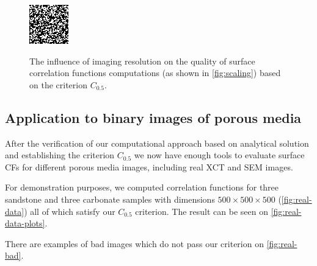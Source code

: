 \documentclass[reprint,amsmath,amssymb,aps,pre,showkeys,showpacs]{revtex4-1}
\begin{document}
\begin{figure}[t]
{    \includegraphics[width=0.475\linewidth]{images/disks-0015-5e-5-64.png}
    \label{fig:disks-64}}
  \caption[]{The influence of imaging resolution on the quality of surface
    correlation functions computations (as shown in \cref{fig:scaling}) based on
    the criterion $C_{0.5}$.}
  \label{fig:disks-res}
\end{figure}

\subsection{Application to binary images of porous media}
\label{sec:application}
After the verification of our computational approach based on analytical
solution and establishing the criterion $C_{0.5}$ we now have enough tools to
evaluate surface CFs for different porous media images, including real XCT and
SEM images.

For demonstration purposes, we computed correlation functions for three
sandstone and three carbonate samples with dimensions
$500 \times 500 \times 500$ (\cref{fig:real-data}) all of which satisfy our
$C_{0.5}$ criterion. The result can be seen on \cref{fig:real-data-plots}.

There are examples of bad images which do not pass our criterion on
\cref{fig:real-bad}.
\end{document}
